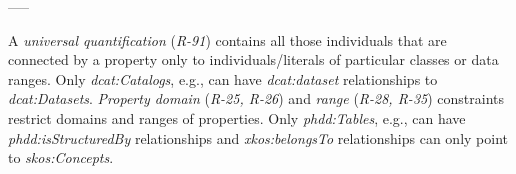 \documentclass{llncs}
\newenvironment{DL}{
  \small
  \vspace{0cm}
	\begin{center}
  \begin{tabular}{c l}

}{
  \end{tabular}
	\end{center}
}
\begin{document}
{{-----

A \emph{universal quantification} (\emph{R-91}) contains all those individuals that are connected by a property only to individuals/literals of particular classes  or data ranges.
Only \emph{dcat:Catalogs}, e.g., can have \emph{dcat:dataset} relationships to \emph{dcat:Datasets}.
\emph{Property domain} (\emph{R-25, R-26}) and \emph{range} (\emph{R-28, R-35}) constraints restrict domains and ranges of properties.
Only \emph{phdd:Tables}, e.g., can have \emph{phdd:isStructuredBy} relationships and
\emph{xkos:belongsTo} relationships can only point to \emph{skos:Concepts}.

}}
\end{document}

